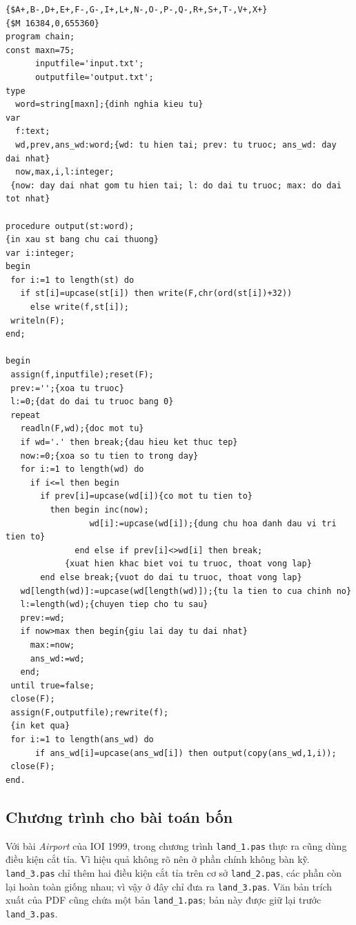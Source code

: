 \documentclass[11pt]{article}
\begin{document}
\begin{verbatim}
{$A+,B-,D+,E+,F-,G-,I+,L+,N-,O-,P-,Q-,R+,S+,T-,V+,X+}
{$M 16384,0,655360}
program chain;
const maxn=75;
      inputfile='input.txt';
      outputfile='output.txt';
type
  word=string[maxn];{dinh nghia kieu tu}
var
  f:text;
  wd,prev,ans_wd:word;{wd: tu hien tai; prev: tu truoc; ans_wd: day dai nhat}
  now,max,i,l:integer;
 {now: day dai nhat gom tu hien tai; l: do dai tu truoc; max: do dai tot nhat}

procedure output(st:word);
{in xau st bang chu cai thuong}
var i:integer;
begin
 for i:=1 to length(st) do
   if st[i]=upcase(st[i]) then write(F,chr(ord(st[i])+32))
     else write(f,st[i]);
 writeln(F);
end;

begin
 assign(f,inputfile);reset(F);
 prev:='';{xoa tu truoc}
 l:=0;{dat do dai tu truoc bang 0}
 repeat
   readln(F,wd);{doc mot tu}
   if wd='.' then break;{dau hieu ket thuc tep}
   now:=0;{xoa so tu tien to trong day}
   for i:=1 to length(wd) do
     if i<=l then begin
       if prev[i]=upcase(wd[i]){co mot tu tien to}
         then begin inc(now);
                 wd[i]:=upcase(wd[i]);{dung chu hoa danh dau vi tri tien to}
              end else if prev[i]<>wd[i] then break;
            {xuat hien khac biet voi tu truoc, thoat vong lap}
       end else break;{vuot do dai tu truoc, thoat vong lap}
   wd[length(wd)]:=upcase(wd[length(wd)]);{tu la tien to cua chinh no}
   l:=length(wd);{chuyen tiep cho tu sau}
   prev:=wd;
   if now>max then begin{giu lai day tu dai nhat}
     max:=now;
     ans_wd:=wd;
   end;
 until true=false;
 close(F);
 assign(F,outputfile);rewrite(f);
 {in ket qua}
 for i:=1 to length(ans_wd) do
      if ans_wd[i]=upcase(ans_wd[i]) then output(copy(ans_wd,1,i));
 close(F);
end.
\end{verbatim}

\subsection{Chương trình cho bài toán bốn}

Với bài \textit{Airport} của IOI 1999, trong chương trình \texttt{land\_1.pas}
thực ra cũng dùng điều kiện cắt tỉa. Vì hiệu quả không rõ nên ở phần chính
không bàn kỹ. \texttt{land\_3.pas} chỉ thêm hai điều kiện cắt tỉa trên cơ sở
\texttt{land\_2.pas}, các phần còn lại hoàn toàn giống nhau; vì vậy ở đây chỉ
đưa ra \texttt{land\_3.pas}. Văn bản trích xuất của PDF cũng chứa một bản
\texttt{land\_1.pas}; bản này được giữ lại trước \texttt{land\_3.pas}.
\end{document}
